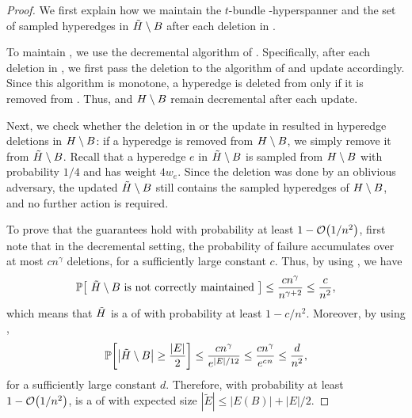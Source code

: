 \begin{proof}
We first explain how we maintain the \( t \)-bundle -hyperspanner  and the set of sampled hyperedges in \( { \tilde H} \setminus {\ensuremath{ B}} \) after each deletion in .


To maintain , we use the decremental algorithm of .
Specifically, after each deletion in , we first pass the deletion to the algorithm of  and update  accordingly.
Since this algorithm is monotone, a hyperedge is deleted from  only if it is removed from .
Thus,  and \( { H} \setminus {\ensuremath{ B}} \) remain decremental after each update.

Next, we check whether the deletion in  or the update in  resulted in hyperedge deletions in \( { H} \setminus {\ensuremath{ B}} \): if a hyperedge is removed from \( { H} \setminus {\ensuremath{ B}} \), we simply remove it from  \( { \tilde H} \setminus {\ensuremath{ B}} \).
Recall that a hyperedge \( e \) in \( { \tilde H} \setminus {\ensuremath{ B}} \) is sampled from \( { H} \setminus {\ensuremath{ B}} \) with probability \( 1/4 \) and has weight \( 4 w_e \).
Since the deletion was done by an oblivious adversary, the updated \( { \tilde H} \setminus {\ensuremath{ B}} \) still contains the sampled hyperedges of \( { H} \setminus {\ensuremath{ B}} \), and no further action is required.



To prove that the guarantees hold with probability at least \( 1 - \atmost{1/n^2} \), first note that in the decremental setting, the probability of failure accumulates over at most \( c n^\gamma \) deletions, for a sufficiently large constant \( c \).
Thus, by using , we have
\begin{equation*}
\mathbb P \left[ \text{ \( \hypergraph{\sparsifier{H}} \setminus \hypergraph{B} \) is not correctly maintained } \right] \leq   \frac{c n^\gamma}{n^{\gamma + 2}} \leq  \frac{c}{n^2},
\end{equation*}
which means that \( { \tilde H} \) is a \SpectralHypersparsifier{} of  with probability at least \( 1 - c/n^2 \).
Moreover, by using ,
\begin{equation*}
\mathbb P \left[ \left|\hypergraph{\sparsifier{H}} \setminus \hypergraph{B} \right| \geq \frac{|E|}{2}\right] \leq \frac{c n^\gamma}{e^{ |E| / 12}} \leq \frac{c n^\gamma}{e^{ \ConstantSize n}}  \leq \frac{d}{n^2},
\end{equation*}
for a sufficiently large constant \( d \).
Therefore,  with probability at least \( 1 - \atmost{1/n^2} \),  is a \SpectralHypersparsifier{} of  with expected size \( |\tilde E| \leq |E(B)| + |E|/2 \).




\end{proof}
